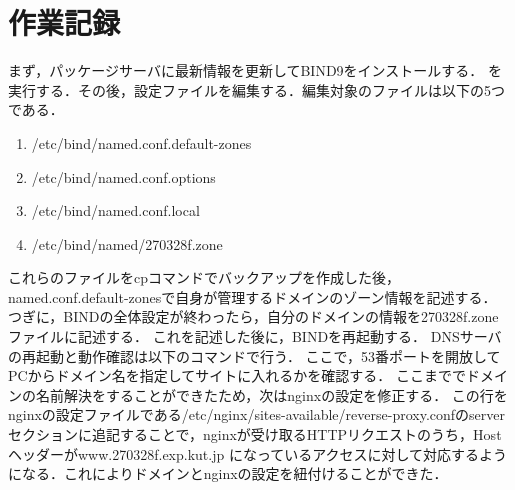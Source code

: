 \documentclass[divpdfmx]{jlreq}
\begin{document}
\section{作業記録}
まず，パッケージサーバに最新情報を更新してBIND9をインストールする．
を実行する．その後，設定ファイルを編集する．編集対象のファイルは以下の5つである．
\begin{enumerate}
    \item /etc/bind/named.conf.default-zones
    \item /etc/bind/named.conf.options
    \item /etc/bind/named.conf.local
    \item /etc/bind/named/270328f.zone
\end{enumerate}
これらのファイルをcpコマンドでバックアップを作成した後，named.conf.default-zonesで自身が管理するドメインのゾーン情報を記述する．
つぎに，BINDの全体設定が終わったら，自分のドメインの情報を270328f.zoneファイルに記述する．
これを記述した後に，BINDを再起動する．
DNSサーバの再起動と動作確認は以下のコマンドで行う．
ここで，53番ポートを開放してPCからドメイン名を指定してサイトに入れるかを確認する．
ここまででドメインの名前解決をすることができたため，次はnginxの設定を修正する．
この行をnginxの設定ファイルである/etc/nginx/sites-available/reverse-proxy.confのserverセクションに追記することで，nginxが受け取るHTTPリクエストのうち，Hostヘッダーがwww.270328f.exp.kut.jp
になっているアクセスに対して対応するようになる．これによりドメインとnginxの設定を紐付けることができた．
\end{document}
